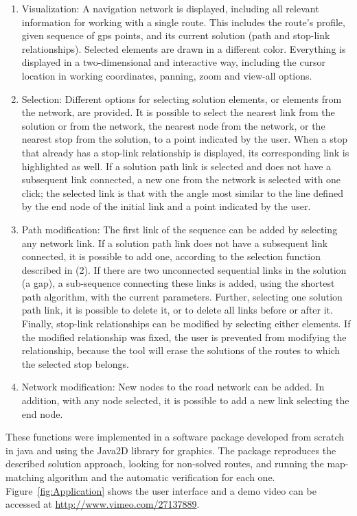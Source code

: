 \begin{enumerate}\styleEnumerate
\item Visualization: A navigation network is displayed, including all relevant information for working with a single route. This includes the route's profile, given sequence of \gls{gps} points, and its current solution (path and stop-link relationships). Selected elements are drawn in a different color. Everything is displayed in a two-dimensional and interactive way, including the cursor location in working coordinates, panning, zoom and view-all options.
%
\item Selection: Different options for selecting solution elements, or elements from the network, are provided. It is possible to select the nearest link from the solution or from the network, the nearest node from the network, or the nearest stop from the solution, to a point indicated by the user. When a stop that already has a stop-link relationship is displayed, its corresponding link is highlighted as well. If a solution path link is selected and does not have a subsequent link connected, a new one from the network is selected with one click; the selected link is that with the angle most similar to the line defined by the end node of the initial link and a point indicated by the user.
%
\item Path modification: The first link of the sequence can be added by selecting any network link. If a solution path link does not have a subsequent link connected, it is possible to add one, according to the selection function described in (2). If there are two unconnected sequential links in the solution (a gap), a sub-sequence  connecting these links is added, using the shortest path algorithm, with the current parameters. Further, selecting one  solution path link, it is possible to delete it, or to delete all links before or after it. Finally, stop-link relationships can be modified by selecting either elements. If the modified relationship was fixed, the user is prevented from modifying the relationship, because the tool will erase the solutions of the routes to which the selected stop belongs.
%
\item Network modification: New nodes to the road network can be added. In addition, with any node selected, it is possible to add a new link selecting the end node.
\end{enumerate}

These functions were implemented in a software package developed from scratch in \gls{java} and using the Java2D library for graphics. The package reproduces the described solution approach, looking for non-solved routes, and running the map-matching algorithm and the automatic verification for each one. Figure~\ref{fig:Application} shows the user interface and a demo video can be accessed at \url{http://www.vimeo.com/27137889}.

